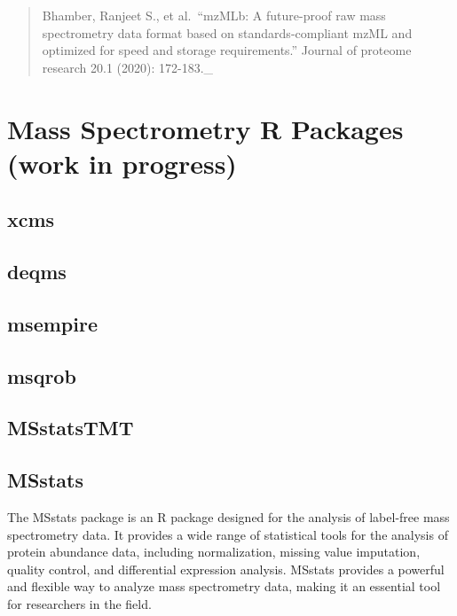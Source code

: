 \documentclass[
]{book}
\begin{document}
\begin{quote}
Bhamber, Ranjeet S., et al.~``mzMLb: A future-proof raw mass spectrometry data format based on standards-compliant mzML and optimized for speed and storage requirements.'' Journal of proteome research 20.1 (2020): 172-183.\_
\end{quote}

\hypertarget{mass-spectrometry-r-packages-work-in-progress}{%
\chapter{Mass Spectrometry R Packages (work in progress)}\label{mass-spectrometry-r-packages-work-in-progress}}

\hypertarget{xcms}{%
\section{xcms}\label{xcms}}

\hypertarget{deqms}{%
\section{deqms}\label{deqms}}

\hypertarget{msempire}{%
\section{msempire}\label{msempire}}

\hypertarget{msqrob}{%
\section{msqrob}\label{msqrob}}

\hypertarget{msstatstmt}{%
\section{MSstatsTMT}\label{msstatstmt}}

\hypertarget{msstats}{%
\section{MSstats}\label{msstats}}

The MSstats package is an R package designed for the analysis of label-free mass spectrometry data. It provides a wide range of statistical tools for the analysis of protein abundance data, including normalization, missing value imputation, quality control, and differential expression analysis. MSstats provides a powerful and flexible way to analyze mass spectrometry data, making it an essential tool for researchers in the field.
\end{document}

